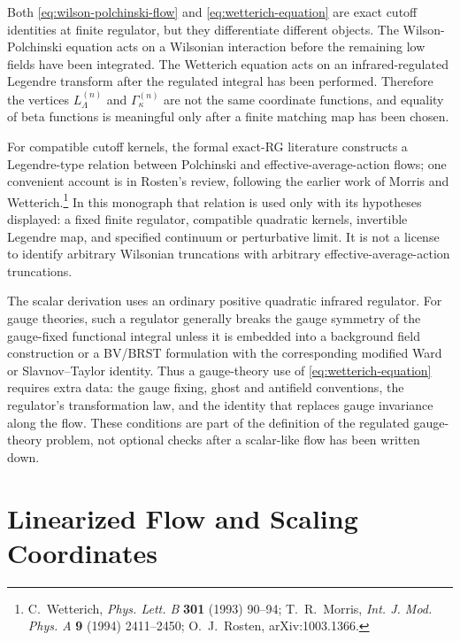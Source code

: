 \begin{remark}
\label{rem:eaa-polchinski-relation}
Both \eqref{eq:wilson-polchinski-flow} and
\eqref{eq:wetterich-equation} are exact cutoff identities at finite regulator,
but they differentiate different objects.  The Wilson-Polchinski equation
acts on a Wilsonian interaction before the remaining low fields have been
integrated.  The Wetterich equation acts on an infrared-regulated Legendre
transform after the regulated integral has been performed.  Therefore the
vertices \(L_\Lambda^{(n)}\) and \(\Gamma_\kappa^{(n)}\) are not the same
coordinate functions, and equality of beta functions is meaningful only after
a finite matching map has been chosen.

For compatible cutoff kernels, the formal exact-RG literature constructs a
Legendre-type relation between Polchinski and effective-average-action flows;
one convenient account is in Rosten's review, following the earlier work of
Morris and Wetterich.\footnote{C.~Wetterich, \emph{Phys. Lett. B}
\textbf{301} (1993) 90--94; T.~R.~Morris, \emph{Int. J. Mod. Phys. A}
\textbf{9} (1994) 2411--2450; O.~J.~Rosten, arXiv:1003.1366.}  In this
monograph that relation is used only with its hypotheses displayed: a fixed
finite regulator, compatible quadratic kernels, invertible Legendre map, and
specified continuum or perturbative limit.  It is not a license to identify
arbitrary Wilsonian truncations with arbitrary effective-average-action
truncations.
\end{remark}

\begin{remark}
The scalar derivation uses an ordinary positive quadratic infrared regulator.
For gauge theories, such a regulator generally breaks the gauge symmetry of
the gauge-fixed functional integral unless it is embedded into a background
field construction or a BV/BRST formulation with the corresponding modified
Ward or Slavnov--Taylor identity.  Thus a gauge-theory use of
\eqref{eq:wetterich-equation} requires extra data: the gauge fixing, ghost and
antifield conventions, the regulator's transformation law, and the identity
that replaces gauge invariance along the flow.  These conditions are part of
the definition of the regulated gauge-theory problem, not optional checks
after a scalar-like flow has been written down.
\end{remark}

\section{Linearized Flow and Scaling Coordinates}

